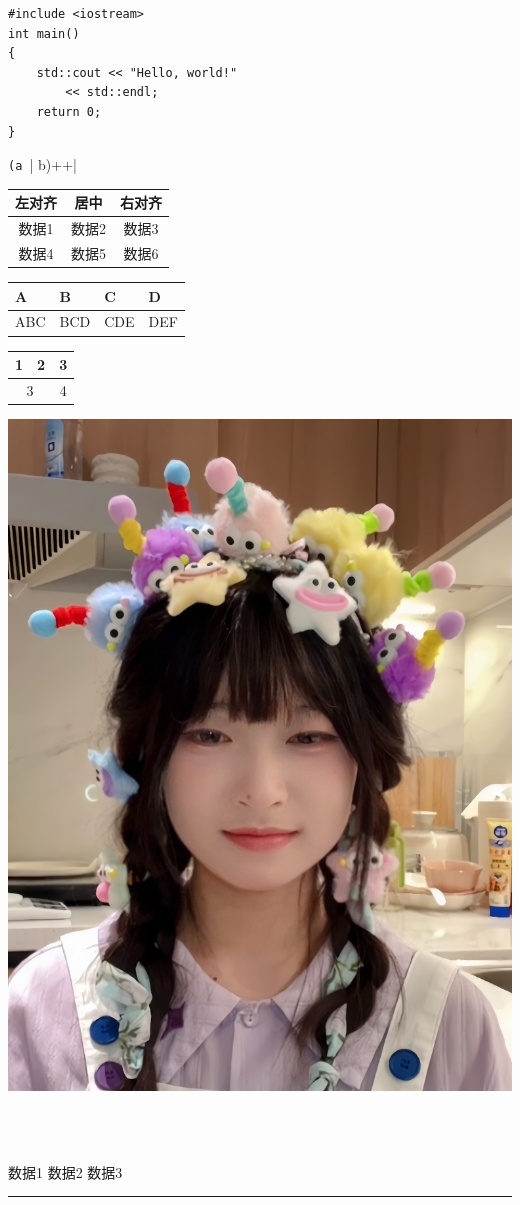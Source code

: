 \documentclass{ctexart}
\begin{document}
\begin{verbatim}
#include <iostream>
int main()
{
    std::cout << "Hello, world!"
        << std::endl;
    return 0;
}
\end{verbatim}
\verb|(a || b)++|
\\
\centering
\begin{tabular}{|c|c|c|}
  \hline
  左对齐 & 居中 & 右对齐 \\
  \hline
  数据1 & 数据2 & 数据3 \\
  \cline{1-2}
  数据4 & 数据5 & 数据6 \\
  \hline
\end{tabular}
\par
\begin{tabularx}{14em}
  {|*{4}{>{\centering\arraybackslash}X|}}
  \hline
  A & B & C & D \\
  \hline
  ABC & BCD & CDE & DEF \\
  \hline
\end{tabularx}
\par
\begin{tabular}{|c|c|c|}
    \hline
    1 & 2 & 3 \\
    \hline
    \multicolumn{2}{|c|}{3} & 4\\
    \hline
    
\end{tabular}
\par
\includegraphics[scale = 0.1]{test.jpg}
\par
{} \\
 \\
\raggedright
\begin{minipage}{3em}
    数据1 数据2 数据3
\end{minipage}
\par
\rule{5pt}{8pt}
\end{document}
